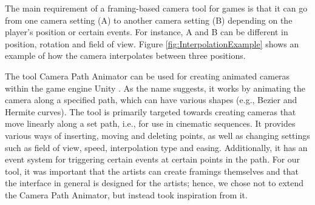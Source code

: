 The main requirement of a framing-based camera tool for games is that it can go from one camera setting (A) to another camera setting (B) depending on the player's position or certain events. For instance, A and B can be different in position, rotation and field of view.
Figure \ref{fig:InterpolationExample} shows an example of how the camera interpolates between three positions.


The tool Camera Path Animator \cite{unity_camTool} can be used for creating animated cameras within the game engine Unity \cite{unity_main}. As the name suggests, it works by animating the camera along a specified path, which can have various shapes (e.g., Bezier and Hermite curves). The tool is primarily targeted towards creating cameras that move linearly along a set path, i.e., for use in cinematic sequences. It provides various ways of inserting, moving and deleting points, as well as changing settings such as field of view, speed, interpolation type and easing. Additionally, it has an event system for triggering certain events at certain points in the path. For our tool, it was important that the artists can create framings themselves and that the interface in general is designed for the artists; hence, we chose not to extend the Camera Path Animator, but instead took inspiration from it.




